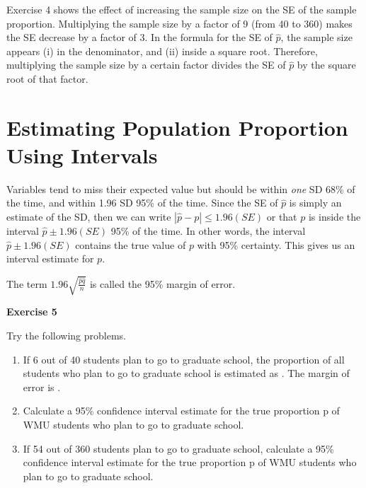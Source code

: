 \documentclass[11pt, chapterprefix=true]{scrbook}\usepackage[]{graphicx}\usepackage[]{color}
\begin{document}
Exercise 4 shows the effect of increasing the sample size on the SE of the sample proportion.  Multiplying the sample size by a factor of 9 (from 40 to 360) makes the SE decrease by a factor of 3.  In the formula for the SE of $\hat{p}$,  the sample size appears (i) in the denominator, and (ii) inside a square root.  Therefore, multiplying the sample size by a certain factor divides the SE of $\hat{p}$ by the square root of that factor.


\section{Estimating Population Proportion Using Intervals}

Variables tend to miss their expected value but should be within \textit{one} SD 68\% of the time, and within 1.96 SD 95\% of the time.  Since the SE of $\hat{p}$ is simply an estimate of the SD, then we can write $| \hat{p} - p | \le 1.96(SE)$ or that $p$ is inside the interval $\hat{p} \pm 1.96(SE)$ 95\% of the time.  In other words, the interval $\hat{p} \pm 1.96(SE)$ contains the true value of $p$ with 95\% certainty.  This gives us an interval estimate for $p$.


The term $1.96 \sqrt{\frac{\hat{p} \hat{q}}{n}}$ is called the 95\% margin of error.

\begin{minipage}[ht]{3cm}

\vspace{-50mm}

\textbf{Exercise 5}
\end{minipage}
\begin{minipage}[ht]{11cm}

\parbox{11cm}{
Try the following problems.

\begin{enumerate}
\item If 6 out of 40 students plan to go to graduate school, the proportion of all students who plan to go to graduate school is estimated as \underline{\phantom{xxxxxxxxxx}}.  The margin of error is \underline{\phantom{xxxxxxxxxx}}.
\item Calculate a 95\% confidence interval estimate for the true proportion p of WMU students who plan to go to graduate school.
\item If 54 out of 360 students plan to go to graduate school, calculate a 95\% confidence interval estimate for the true proportion p of WMU students who plan to go to graduate school.
\end{enumerate}
}
\end{minipage}
\end{document}
